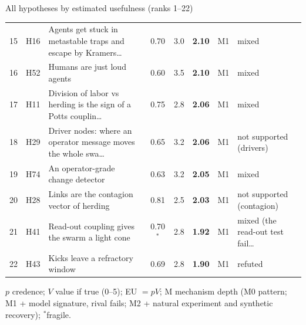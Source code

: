 \begin{frame}{All hypotheses by estimated usefulness (ranks 1--22)}
{\begin{tabular}{@{}rl>{\raggedright\arraybackslash}p{}ccccl@{}}
15 & H16 & Agents get stuck in metastable traps and escape by Kramers\ldots & 0.70 & 3.0 & \textbf{2.10} & M1 & mixed\\
16 & H52 & Humans are just loud agents & 0.60 & 3.5 & \textbf{2.10} & M1 & mixed\\
17 & H11 & Division of labor vs herding is the sign of a Potts couplin\ldots & 0.75 & 2.8 & \textbf{2.06} & M1 & mixed\\
18 & H29 & Driver nodes: where an operator message moves the whole swa\ldots & 0.65 & 3.2 & \textbf{2.06} & M1 & not supported (drivers)\\
19 & H74 & An operator-grade change detector & 0.63 & 3.2 & \textbf{2.05} & M1 & mixed\\
20 & H28 & Links are the contagion vector of herding & 0.81 & 2.5 & \textbf{2.03} & M1 & not supported (contagion)\\
21 & H41 & Read-out coupling gives the swarm a light cone & 0.70$^\ast$ & 2.8 & \textbf{1.92} & M1 & mixed (the read-out test fail\ldots\\
22 & H43 & Kicks leave a refractory window & 0.69 & 2.8 & \textbf{1.90} & M1 & refuted\\
\end{tabular}}\par\vspace{0.2em}
{\tiny\color{muted}$p$ credence; $V$ value if true (0--5); EU $=pV$; M mechanism depth (M0 pattern; M1 + model signature, rival fails; M2 + natural experiment and synthetic recovery); $^\ast$fragile.}
\end{frame}

